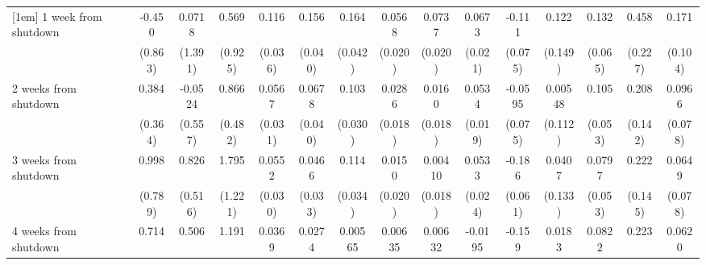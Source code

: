 \begin{table}[htbp]
\begin{tabular}{l*{14}{c}}
[1em]
1 week from shutdown&      -0.450         &      0.0718         &       0.569         &       0.116\sym{***}&       0.156\sym{***}&       0.164\sym{***}&      0.0568\sym{***}&      0.0737\sym{***}&      0.0673\sym{***}&      -0.111         &       0.122         &       0.132\sym{**} &       0.458\sym{*}  &       0.171         \\
                    &     (0.863)         &     (1.391)         &     (0.925)         &     (0.036)         &     (0.040)         &     (0.042)         &     (0.020)         &     (0.020)         &     (0.021)         &     (0.075)         &     (0.149)         &     (0.065)         &     (0.227)         &     (0.104)         \\
[1em]
2 weeks from shutdown&       0.384         &     -0.0524         &       0.866\sym{*}  &      0.0567\sym{*}  &      0.0678\sym{*}  &       0.103\sym{***}&      0.0286         &      0.0160         &      0.0534\sym{***}&     -0.0595         &     0.00548         &       0.105\sym{*}  &       0.208         &      0.0966         \\
                    &     (0.364)         &     (0.557)         &     (0.482)         &     (0.031)         &     (0.040)         &     (0.030)         &     (0.018)         &     (0.018)         &     (0.019)         &     (0.075)         &     (0.112)         &     (0.053)         &     (0.142)         &     (0.078)         \\
[1em]
3 weeks from shutdown&       0.998         &       0.826         &       1.795         &      0.0552\sym{*}  &      0.0466         &       0.114\sym{***}&      0.0150         &     0.00410         &      0.0533\sym{**} &      -0.186\sym{***}&      0.0407         &      0.0797         &       0.222         &      0.0649         \\
                    &     (0.789)         &     (0.516)         &     (1.221)         &     (0.030)         &     (0.033)         &     (0.034)         &     (0.020)         &     (0.018)         &     (0.024)         &     (0.061)         &     (0.133)         &     (0.053)         &     (0.145)         &     (0.078)         \\
[1em]
4 weeks from shutdown&       0.714         &       0.506         &       1.191         &      0.0369         &      0.0274         &     0.00565         &     0.00635         &     0.00632         &     -0.0195         &      -0.159\sym{**} &      0.0183         &      0.0822\sym{*}  &       0.223         &      0.0620         \\

\end{tabular}
\end{table}

